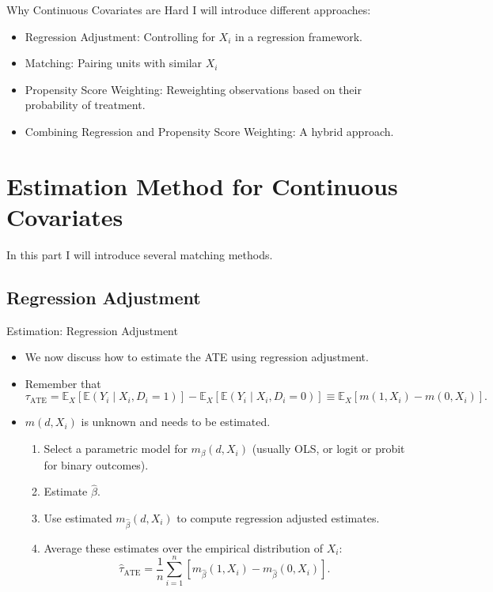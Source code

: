 \documentclass[11pt,aspectratio=169]{beamer}
\begin{document}
\begin{frame}{Why Continuous Covariates are Hard}
I will introduce different approaches:
\begin{itemize}
  \item Regression Adjustment: Controlling for $X_i$ in a regression framework.
  \item Matching: Pairing units with similar $X_i$
  \item Propensity Score Weighting: Reweighting observations based on their probability of treatment.
  \item Combining Regression and Propensity Score Weighting: A hybrid approach.
\end{itemize}
\end{frame}


\section{Estimation Method for Continuous Covariates}
\begin{frame}
In this part I will introduce several matching methods.

\end{frame}

\subsection{Regression Adjustment}

\begin{frame}{Estimation: Regression Adjustment}

\begin{itemize}
    \item We now discuss how to estimate the ATE using regression adjustment.
    \item Remember that
    $$\tau_{\text{ATE}} = \mathbb{E}_X[\mathbb{E}(Y_i \mid X_i, D_i = 1)] - \mathbb{E}_X[\mathbb{E}(Y_i \mid X_i, D_i = 0)] \equiv \mathbb{E}_X[m(1, X_i) - m(0, X_i)].$$
    \item $m(d, X_i)$ is unknown and needs to be estimated.
    \begin{enumerate}
        \item[(0)] Select a parametric model for $m_\beta(d, X_i)$ (usually OLS, or logit or probit for binary outcomes).
        \item[(1)] Estimate $\widehat{\beta}$.
        \item[(2)] Use estimated $m_{\widehat{\beta}}(d, X_i)$ to compute regression adjusted estimates.
        \item[(3)] Average these estimates over the empirical distribution of $X_i$:
        $$\widehat{\tau}_{\text{ATE}} = \frac{1}{n} \sum_{i=1}^n \left[m_{\widehat{\beta}}(1, X_i) - m_{\widehat{\beta}}(0, X_i)\right].$$
    \end{enumerate}
\end{itemize}

\end{frame}
\end{document}
